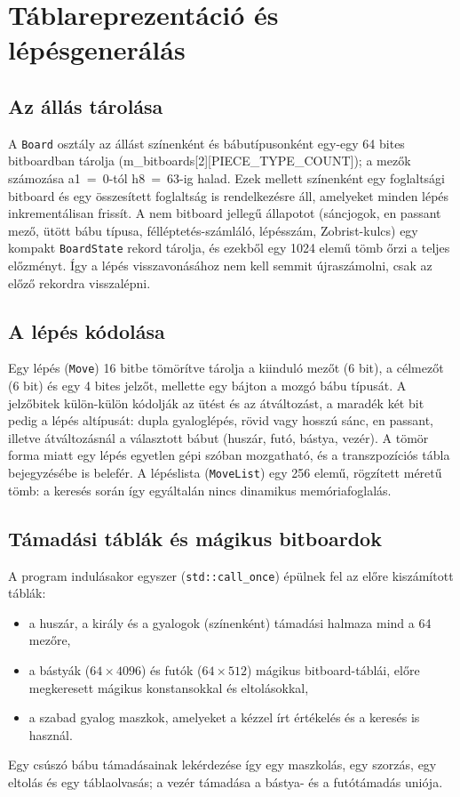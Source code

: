 \chapter{Táblareprezentáció és lépésgenerálás}\label{chap:movegen}

\section{Az állás tárolása}

A \texttt{Board} osztály az állást színenként és bábutípusonként egy-egy 64 bites bitboardban tárolja (m\_bitboards[2][PIECE\_TYPE\_COUNT]); a mezők számozása a1~=~0-tól h8~=~63-ig halad. Ezek mellett színenként egy foglaltsági bitboard és egy összesített foglaltság is rendelkezésre áll, amelyeket minden lépés inkrementálisan frissít. A nem bitboard jellegű állapotot (sáncjogok, en passant mező, ütött bábu típusa, félléptetés-számláló, lépésszám, Zobrist-kulcs) egy kompakt \texttt{BoardState} rekord tárolja, és ezekből egy 1024 elemű tömb őrzi a teljes előzményt. Így a lépés visszavonásához nem kell semmit újraszámolni, csak az előző rekordra visszalépni.

\section{A lépés kódolása}

Egy lépés (\texttt{Move}) 16 bitbe tömörítve tárolja a kiinduló mezőt (6 bit), a célmezőt (6 bit) és egy 4 bites jelzőt, mellette egy bájton a mozgó bábu típusát. A jelzőbitek külön-külön kódolják az ütést és az átváltozást, a maradék két bit pedig a lépés altípusát: dupla gyaloglépés, rövid vagy hosszú sánc, en passant, illetve átváltozásnál a választott bábut (huszár, futó, bástya, vezér). A tömör forma miatt egy lépés egyetlen gépi szóban mozgatható, és a transzpozíciós tábla bejegyzésébe is belefér. A lépéslista (\texttt{MoveList}) egy 256 elemű, rögzített méretű tömb: a keresés során így egyáltalán nincs dinamikus memóriafoglalás.

\section{Támadási táblák és mágikus bitboardok}

A program indulásakor egyszer (\texttt{std::call\_once}) épülnek fel az előre kiszámított táblák:
\begin{itemize}
	\item a huszár, a király és a gyalogok (színenként) támadási halmaza mind a 64 mezőre,
	\item a bástyák ($64\times4096$) és futók ($64\times512$) mágikus bitboard-táblái, előre megkeresett mágikus konstansokkal és eltolásokkal,
	\item a szabad gyalog maszkok, amelyeket a kézzel írt értékelés és a keresés is használ.
\end{itemize}
Egy csúszó bábu támadásainak lekérdezése így egy maszkolás, egy szorzás, egy eltolás és egy táblaolvasás; a vezér támadása a bástya- és a futótámadás uniója.

